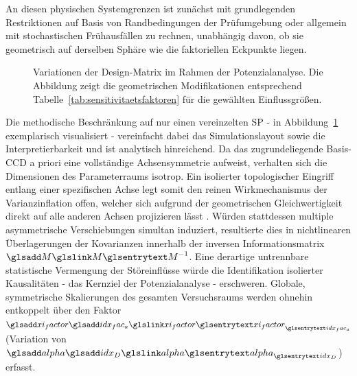 An diesen physischen Systemgrenzen ist zunächst mit grundlegenden Restriktionen auf Basis von Randbedingungen der Prüfumgebung oder allgemein mit stochastischen Frühausfällen zu rechnen, unabhängig davon, ob sie geometrisch auf derselben Sphäre wie die faktoriellen Eckpunkte liegen.
\begin{figure}[!htbp]
    \centering
    \setlength{}
    \setlength\figureheight{\figurewidth}
    
    \caption{Variationen der Design-Matrix im Rahmen der Potenzialanalyse. Die Abbildung zeigt die geometrischen Modifikationen entsprechend Tabelle~\ref{tab:sensitivitaetsfaktoren} für die gewählten Einflussgrößen.}
    \label{fig:ccd_design_sensitivitaet}
\end{figure}
Die methodische Beschränkung auf nur einen vereinzelten \ac{SP} - in Abbildung~\ref{fig:ccd_design_sensitivitaet} exemplarisch visualisiert - vereinfacht dabei das Simulationslayout sowie die Interpretierbarkeit und ist analytisch hinreichend.
Da das zugrundeliegende Basis-\ac{CCD} a priori eine vollständige Achsensymmetrie aufweist, verhalten sich die Dimensionen des Parameterraums isotrop.
Ein isolierter topologischer Eingriff entlang einer spezifischen Achse legt somit den reinen Wirkmechanismus der Varianzinflation offen, welcher sich aufgrund der geometrischen Gleichwertigkeit direkt auf alle anderen Achsen projizieren lässt \cite{Kleppmann.2020}.
Würden stattdessen multiple asymmetrische Verschiebungen simultan induziert, resultierte dies in nichtlinearen Überlagerungen der Kovarianzen innerhalb der inversen Informationsmatrix $\sym{M}^{-1}$.
Eine derartige untrennbare statistische Vermengung der Störeinflüsse würde die Identifikation isolierter Kausalitäten - das Kernziel der Potenzialanalyse - erschweren.
Globale, symmetrische Skalierungen des gesamten Versuchsraums werden ohnehin entkoppelt über den Faktor $\symsub{xi_factor}{idx_fac_a}$ (Variation von $\symsub{alpha}{idx_D}$) erfasst.
